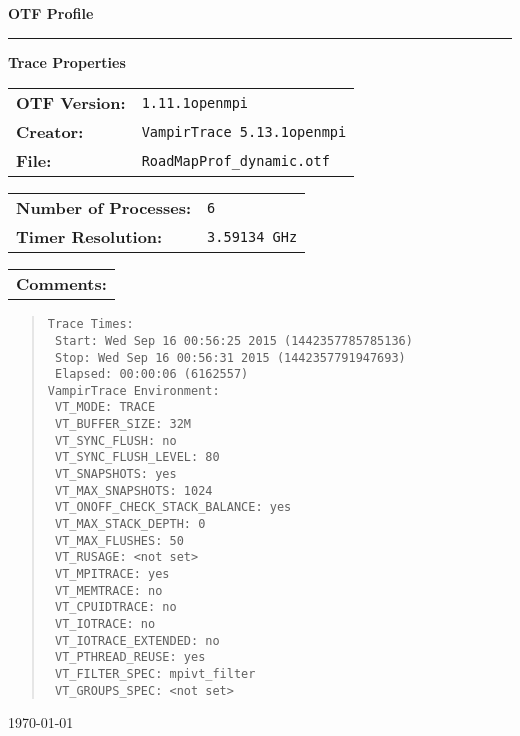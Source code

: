 \documentclass[a4paper,10pt]{article}
\begin{document}
\begin{titlepage}\thispagestyle{empty}
\begin{huge}\begin{flushleft}\bf{OTF Profile}\end{flushleft}\end{huge}
\hrule
\begin{flushright}\textbf{\large Trace Properties}\end{flushright}
\vspace{0.5\baselineskip}
\begin{flushleft}
\begin{tabular}{ll}
\bf{OTF Version:} & \verb|1.11.1openmpi| \\
\bf{Creator:} & \verb|VampirTrace 5.13.1openmpi|\\
\bf{File:} & \verb|RoadMapProf_dynamic.otf|
\end{tabular}

\vspace{1\baselineskip}
\begin{tabular}{ll}
\bf{Number of Processes:} & \verb|6|\\
\bf{Timer Resolution:} & \verb|3.59134 GHz|
\end{tabular}

\vspace{1\baselineskip}
\begin{tabular}{l}\bf{Comments:}\end{tabular}
\begin{quote}\begin{verbatim}
Trace Times:
 Start: Wed Sep 16 00:56:25 2015 (1442357785785136)
 Stop: Wed Sep 16 00:56:31 2015 (1442357791947693)
 Elapsed: 00:00:06 (6162557)
VampirTrace Environment:
 VT_MODE: TRACE
 VT_BUFFER_SIZE: 32M
 VT_SYNC_FLUSH: no
 VT_SYNC_FLUSH_LEVEL: 80
 VT_SNAPSHOTS: yes
 VT_MAX_SNAPSHOTS: 1024
 VT_ONOFF_CHECK_STACK_BALANCE: yes
 VT_MAX_STACK_DEPTH: 0
 VT_MAX_FLUSHES: 50
 VT_RUSAGE: <not set>
 VT_MPITRACE: yes
 VT_MEMTRACE: no
 VT_CPUIDTRACE: no
 VT_IOTRACE: no
 VT_IOTRACE_EXTENDED: no
 VT_PTHREAD_REUSE: yes
 VT_FILTER_SPEC: mpivt_filter
 VT_GROUPS_SPEC: <not set>
\end{verbatim}\end{quote}
\end{flushleft}
\vspace*{\fill}
\begin{flushright}\today\end{flushright}
\end{titlepage}
\end{document}

